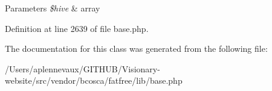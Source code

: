 \begin{DoxyParams}{Parameters}
{\em \$hive} & array \\
\hline
\end{DoxyParams}


Definition at line 2639 of file base.\+php.



The documentation for this class was generated from the following file\+:\begin{DoxyCompactItemize}
\item 
/\+Users/aplennevaux/\+G\+I\+T\+H\+U\+B/\+Visionary-\/website/src/vendor/bcosca/fatfree/lib/base.\+php\end{DoxyCompactItemize}
